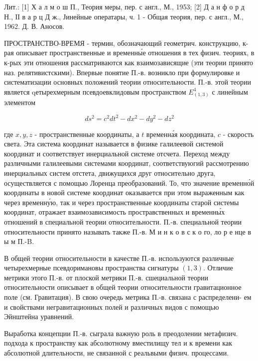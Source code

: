 \documentclass[10pt]{article}
\begin{document}
Лит.: [1] Х а л м о ш П., Теория меры, пер. с англ., М., 1953; [2] Д а н ф о р д Н., ІІ в а р ц Д ж., Јинейные оператары, ч. 1 - Общая теория, пер. с англ., М., 1962. Д. В. Аносов.



ПРОСТРАНСТВО-ВРЕМЯ - термин, обозначающий геометрич. конструкцию, к-рая описывает пространственные и временны́е отношения в тех физич. теориях, в к-рых эти отношения рассматриваются как взаимозависящие (эти теории принято наз. релятивистскими). Впервые понятие П.-в. возникло при формулировке и систематизации основных положений теории относительности. П.-в. этой теории является qетырехмерным псевдоевклидовым пространством $E_{(1,3)}^{4}$ с линейным элементом



\[

d s^{2}=c^{2} d t^{2}-d x^{2}-d y^{2}-d z^{2}

\]



где $x, y, z$ - пространственные координаты, а $t$ временна́я координата, $c$ - скорость света. Эта система координат называется в физике галилеевой системой координат и соответствует инерциальной системе отсчета. Переход между различными галилеевыми системами координат, соответствуюгий рассмотрению инерциальных систем отстета, движущихся друг относительно друга, осуществляется с помощью Лоренца преобразований. То, что значение временно́й координаты в новой системе координат оказывается при этом выраженным как через временну́ю, так и через пространственные координаты старой системы координат, отражает взаимозависимость простравственных и временны́х отношений в специальной теории относительности. П.-в. специальной теории относительности принято называть также П.-в. М и н к о в с к о го, ло р е нце в ы м П.-B.



В общей теории относительности в качестве П.-в. используются различные четырехмерные псевдоримановы пространства сигнатуры $(1,3)$. Отличие метрики этого П.-в. от плоской метрики П.-в. сшециальной теории относительности описывает в общей теории относительности гравитационное поле (см. Гравитация). В свою очередь метрика П.-в. связана с распределени- ем и свойствами негравитационных полей и различных видов с помощью Эйнштейна уравнений.



Выработка концепции П.-в. сыграла важную роль в преодолении метафизич. подхода к пространству как абсолютному вместилищу тел и к времени как абсолютной длительности, не связанной с реальвыми физич. процессами.
\end{document}
